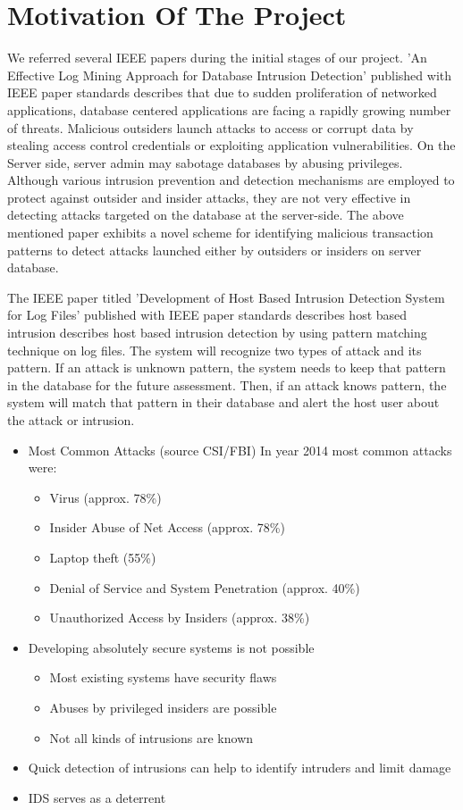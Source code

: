 \documentclass[12pt,a4paper]{report}
\begin{document}
\section{Motivation Of The Project}
We referred several IEEE papers during the
initial stages of our project. 'An Effective Log Mining
Approach for Database Intrusion Detection'
published with IEEE paper standards describes that
due to sudden proliferation of networked applications,
database centered applications are facing a
rapidly growing number of threats. Malicious outsiders
launch attacks to access or corrupt data by
stealing access control credentials or exploiting application
vulnerabilities. On the Server side, server
admin may sabotage databases by abusing privileges.
Although various intrusion prevention and
detection mechanisms are employed to protect
against outsider and insider attacks, they are not
very effective in detecting attacks targeted on the
database at the server-side. The above mentioned
paper exhibits a novel scheme for identifying malicious
transaction patterns to detect attacks launched
either by outsiders or insiders on server database.

The IEEE paper titled 'Development of Host
Based Intrusion Detection System for Log Files' published with IEEE paper standards describes host
based intrusion describes host based intrusion detection
by using pattern matching technique on log
files. The system will recognize two types of attack
and its pattern. If an attack is unknown pattern, the
system needs to keep that pattern in the database for
the future assessment. Then, if an attack knows pattern,
the system will match that pattern in their database
and alert the host user about the attack or intrusion.
\begin{itemize}
\item Most Common Attacks (source CSI/FBI)
        In year 2014 most common attacks were:
        \begin{itemize}
        \item Virus (approx. 78\%)
\item Insider Abuse of Net Access (approx. 78\%)
\item Laptop theft (55\%)
\item Denial of Service and System Penetration (approx. 40\%)	
\item Unauthorized Access by Insiders (approx. 38\%)
        \end{itemize}

\item Developing absolutely secure systems is not possible
\begin{itemize}
\item Most existing systems have security flaws
\item	Abuses by privileged insiders are possible
\item Not all kinds of intrusions are known
\end{itemize}

\item Quick detection of intrusions can help to identify intruders and limit damage
\item IDS serves as a deterrent

\end{itemize}
\end{document}
